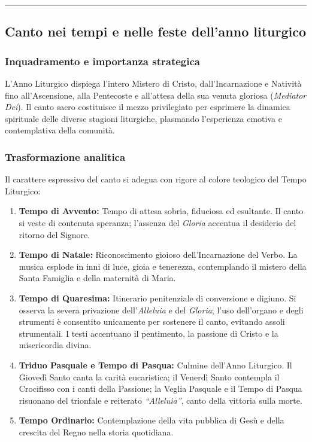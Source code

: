 \documentclass[12pt,a4paper]{article}
\begin{document}
	\begin{center}\rule{0.5\linewidth}{0.5pt}\end{center}
	
	\subsection{Canto nei tempi e nelle feste dell'anno liturgico}\label{canto-nei-tempi-e-nelle-feste-dellanno-liturgico}
	
	\subsubsection{Inquadramento e importanza strategica}\label{inquadramento-e-importanza-strategica-9}
	
	L'Anno Liturgico dispiega l'intero Mistero di Cristo, dall'Incarnazione e Natività fino all'Ascensione, alla Pentecoste e all'attesa della sua venuta gloriosa (\emph{Mediator Dei}). Il canto sacro costituisce il mezzo privilegiato per esprimere la dinamica spirituale delle diverse stagioni liturgiche, plasmando l'esperienza emotiva e contemplativa della comunità.
	
	\subsubsection{Trasformazione analitica}\label{trasformazione-analitica-10}
	
	Il carattere espressivo del canto si adegua con rigore al colore teologico del Tempo Liturgico:
	
	\begin{enumerate}[label=\arabic*.,leftmargin=*]
		\item \textbf{Tempo di Avvento:} Tempo di attesa sobria, fiduciosa ed esultante. Il canto si veste di contenuta speranza; l'assenza del \emph{Gloria} accentua il desiderio del ritorno del Signore.
		\item \textbf{Tempo di Natale:} Riconoscimento gioioso dell'Incarnazione del Verbo. La musica esplode in inni di luce, gioia e tenerezza, contemplando il mistero della Santa Famiglia e della maternità di Maria.
		\item \textbf{Tempo di Quaresima:} Itinerario penitenziale di conversione e digiuno. Si osserva la severa privazione dell'\emph{Alleluia} e del \emph{Gloria}; l'uso dell'organo e degli strumenti è consentito unicamente per sostenere il canto, evitando assoli strumentali. I testi accentuano il pentimento, la passione di Cristo e la misericordia divina.
		\item \textbf{Triduo Pasquale e Tempo di Pasqua:} Culmine dell'Anno Liturgico. Il Giovedì Santo canta la carità eucaristica; il Venerdì Santo contempla il Crocifisso con i canti della Passione; la Veglia Pasquale e il Tempo di Pasqua risuonano del trionfale e reiterato \emph{``Alleluia''}, canto della vittoria sulla morte.
		\item \textbf{Tempo Ordinario:} Contemplazione della vita pubblica di Gesù e della crescita del Regno nella storia quotidiana.
	\end{enumerate}
	
\end{document}
